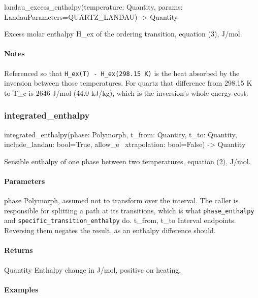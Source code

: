 \documentclass[10pt,a4paper,twoside]{report}
\begin{document}
\begin{verbatimsmall}
landau_excess_enthalpy(temperature: Quantity, params: LandauParameters=QUARTZ_LANDAU) -> Quantity
\end{verbatimsmall}

Excess molar enthalpy H\_ex of the ordering transition, equation (3), J/mol.

\paragraph*{Notes}

Referenced so that \texttt{H\_ex(T) - H\_ex(298.15 K)} is the heat absorbed by the inversion between those temperatures. For quartz that difference from 298.15 K to T\_c is 2646 J/mol (44.0 kJ/kg), which is the inversion's whole energy cost.

\subsubsection*{integrated\_enthalpy}

\begin{verbatimsmall}
integrated_enthalpy(phase: Polymorph, t_from: Quantity, t_to: Quantity, include_landau: bool=True, allow_e
    \ xtrapolation: bool=False) -> Quantity
\end{verbatimsmall}

Sensible enthalpy of one phase between two temperatures, equation (2), J/mol.

\paragraph*{Parameters}

phase Polymorph, assumed not to transform over the interval. The caller is responsible for splitting a path at its transitions, which is what \texttt{phase\_enthalpy} and \texttt{specific\_transition\_enthalpy} do. t\_from, t\_to Interval endpoints. Reversing them negates the result, as an enthalpy difference should.

\paragraph*{Returns}

Quantity Enthalpy change in J/mol, positive on heating.

\paragraph*{Examples}
\end{document}
